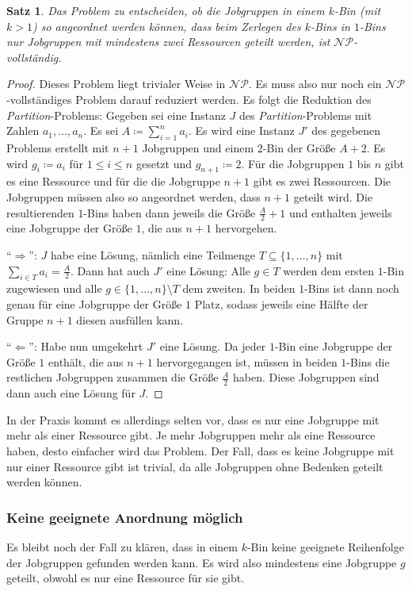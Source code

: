 \documentclass{scrreprt}
\newtheorem{satz}{Satz}
\begin{document}
\begin{satz}
    Das Problem zu entscheiden, ob die Jobgruppen in einem $k$-Bin (mit $k>1$) so angeordnet werden können,
    dass beim Zerlegen des $k$-Bins in $1$-Bins nur Jobgruppen mit mindestens zwei Ressourcen geteilt werden, ist $\mathcal{NP}$-vollständig.
\end{satz}
\begin{proof}
    Dieses Problem liegt trivialer Weise in $\mathcal{NP}$.
    Es muss also nur noch ein $\mathcal{NP}$-vollständiges Problem darauf reduziert werden.
    Es folgt die Reduktion des \textit{Partition}-Problems:
    Gegeben sei eine Instanz $J$ des \textit{Partition}-Problems mit Zahlen $a_1,\ldots,a_n$.
    Es sei $A\coloneqq\sum_{i=1}^{n}a_i$.
    Es wird eine Instanz $J'$ des gegebenen Problems erstellt mit $n+1$ Jobgruppen und einem $2$-Bin der Größe $A+2$.
    Es wird $g_i \coloneqq a_i$ für $1\leq i\leq n$ gesetzt und $g_{n+1}\coloneqq 2$.
    Für die Jobgruppen $1$ bis $n$ gibt es eine Ressource und für die die Jobgruppe $n+1$ gibt es zwei Ressourcen.
    Die Jobgruppen müssen also so angeordnet werden, dass $n+1$ geteilt wird.
    Die resultierenden $1$-Bins haben dann jeweils die Größe $\frac{A}{2}+1$ und enthalten jeweils eine Jobgruppe der Größe $1$, die aus $n+1$ hervorgehen.

    "`$\Rightarrow$"': $J$ habe eine Lösung, nämlich eine Teilmenge $T\subseteq\{1,\ldots,n\}$ mit $\sum_{i\in T}a_i = \frac{A}{2}$.
    Dann hat auch $J'$ eine Lösung: Alle $g\in T$ werden dem ersten $1$-Bin zugewiesen und alle $g\in\{1,\ldots,n\}\setminus T$ dem zweiten.
    In beiden $1$-Bins ist dann noch genau für eine Jobgruppe der Größe $1$ Platz, sodass jeweils eine Hälfte der Gruppe $n+1$ diesen ausfüllen kann.

    "`$\Leftarrow$"': Habe nun umgekehrt $J'$ eine Lösung. Da jeder $1$-Bin eine Jobgruppe der Größe $1$ enthält, die aus $n+1$ hervorgegangen ist,
    müssen in beiden $1$-Bins die restlichen Jobgruppen zusammen die Größe $\frac{A}{2}$ haben.
    Diese Jobgruppen sind dann auch eine Lösung für $J$.
\end{proof}

In der Praxis kommt es allerdings selten vor, dass es nur eine Jobgruppe mit mehr als einer Ressource gibt.
Je mehr Jobgruppen mehr als eine Ressource haben, desto einfacher wird das Problem.
Der Fall, dass es keine Jobgruppe mit nur einer Ressource gibt ist trivial, da alle Jobgruppen ohne Bedenken geteilt werden können.

\subsubsection{Keine geeignete Anordnung möglich}
Es bleibt noch der Fall zu klären, dass in einem $k$-Bin keine geeignete Reihenfolge der Jobgruppen gefunden werden kann.
Es wird also mindestens eine Jobgruppe $g$ geteilt, obwohl es nur eine Ressource für sie gibt.
\end{document}
